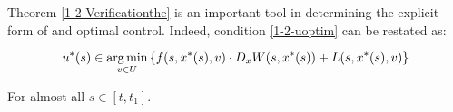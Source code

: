 Theorem \ref{1-2-Verificationthe} is an important tool in determining the explicit form of and optimal control. 
    Indeed, condition \ref{1-2-uoptim} can be restated as:

    \begin{equation}\label{1-2-optimalityconditionu}
        u^{\ast}(s) \in \operatorname*{arg\,min}_{v\in U} \left\{ f(s,x^{\ast}(s),v) \cdot D_xW(s,x^{\ast}(s)) + L(s,x^{\ast}(s),v)\right\}
    \end{equation}

    For almost all $s\in[t,t_1]$.